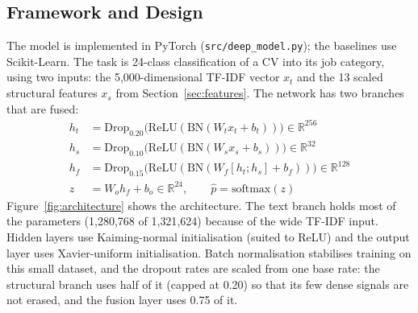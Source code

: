 \documentclass[11pt,a4paper]{article}
\begin{document}
\subsection{Framework and Design}
The model is implemented in PyTorch (\texttt{src/deep\_model.py}); the
baselines use Scikit-Learn. The task is 24-class classification of a CV into
its job category, using two inputs: the 5{,}000-dimensional TF-IDF vector
$x_t$ and the 13 scaled structural features $x_s$ from Section~\ref{sec:features}.
The network has two branches that are fused:
\begin{align*}
h_t &= \mathrm{Drop}_{0.20}\big(\mathrm{ReLU}(\mathrm{BN}(W_t x_t + b_t))\big) \in \mathbb{R}^{256}\\
h_s &= \mathrm{Drop}_{0.10}\big(\mathrm{ReLU}(\mathrm{BN}(W_s x_s + b_s))\big) \in \mathbb{R}^{32}\\
h_f &= \mathrm{Drop}_{0.15}\big(\mathrm{ReLU}(\mathrm{BN}(W_f [h_t;h_s] + b_f))\big) \in \mathbb{R}^{128}\\
z &= W_o h_f + b_o \in \mathbb{R}^{24}, \qquad \hat{p} = \mathrm{softmax}(z)
\end{align*}
Figure~\ref{fig:architecture} shows the architecture. The text branch holds
most of the parameters (1{,}280{,}768 of 1{,}321{,}624) because of the wide
TF-IDF input. Hidden layers use Kaiming-normal initialisation (suited to
ReLU) and the output layer uses Xavier-uniform initialisation. Batch
normalisation stabilises training on this small dataset, and the dropout
rates are scaled from one base rate: the structural branch uses half of it
(capped at 0.20) so that its few dense signals are not erased, and the fusion
layer uses 0.75 of it.
\end{document}
